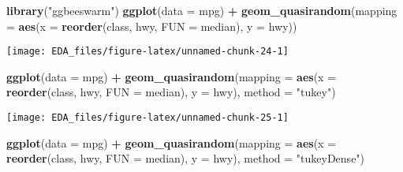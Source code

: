 \documentclass[]{book}
\newenvironment{Shaded}{\begin{snugshade}}{\end{snugshade}}
\newcommand{\DataTypeTok}[1]{\textcolor[rgb]{0.13,0.29,0.53}{#1}}
\newcommand{\KeywordTok}[1]{\textcolor[rgb]{0.13,0.29,0.53}{\textbf{#1}}}
\newcommand{\NormalTok}[1]{#1}
\newcommand{\OperatorTok}[1]{\textcolor[rgb]{0.81,0.36,0.00}{\textbf{#1}}}
\newcommand{\StringTok}[1]{\textcolor[rgb]{0.31,0.60,0.02}{#1}}
\theoremstyle{definition}
\theoremstyle{definition}
\theoremstyle{definition}
\theoremstyle{remark}
\begin{document}
\begin{Shaded}
\begin{Highlighting}[]
\KeywordTok{library}\NormalTok{(}\StringTok{"ggbeeswarm"}\NormalTok{)}
\KeywordTok{ggplot}\NormalTok{(}\DataTypeTok{data =}\NormalTok{ mpg) }\OperatorTok{+}
\StringTok{  }\KeywordTok{geom_quasirandom}\NormalTok{(}\DataTypeTok{mapping =} \KeywordTok{aes}\NormalTok{(}\DataTypeTok{x =} \KeywordTok{reorder}\NormalTok{(class, hwy, }\DataTypeTok{FUN =}\NormalTok{ median),}
                                 \DataTypeTok{y =}\NormalTok{ hwy))}
\end{Highlighting}
\end{Shaded}

\begin{center}\texttt{[image: EDA\_files/figure-latex/unnamed-chunk-24-1]} \end{center}

\begin{Shaded}
\begin{Highlighting}[]
\KeywordTok{ggplot}\NormalTok{(}\DataTypeTok{data =}\NormalTok{ mpg) }\OperatorTok{+}
\StringTok{  }\KeywordTok{geom_quasirandom}\NormalTok{(}\DataTypeTok{mapping =} \KeywordTok{aes}\NormalTok{(}\DataTypeTok{x =} \KeywordTok{reorder}\NormalTok{(class, hwy, }\DataTypeTok{FUN =}\NormalTok{ median),}
                                 \DataTypeTok{y =}\NormalTok{ hwy),}
                   \DataTypeTok{method =} \StringTok{"tukey"}\NormalTok{)}
\end{Highlighting}
\end{Shaded}

\begin{center}\texttt{[image: EDA\_files/figure-latex/unnamed-chunk-25-1]} \end{center}

\begin{Shaded}
\begin{Highlighting}[]
\KeywordTok{ggplot}\NormalTok{(}\DataTypeTok{data =}\NormalTok{ mpg) }\OperatorTok{+}
\StringTok{  }\KeywordTok{geom_quasirandom}\NormalTok{(}\DataTypeTok{mapping =} \KeywordTok{aes}\NormalTok{(}\DataTypeTok{x =} \KeywordTok{reorder}\NormalTok{(class, hwy, }\DataTypeTok{FUN =}\NormalTok{ median),}
                                 \DataTypeTok{y =}\NormalTok{ hwy),}
                   \DataTypeTok{method =} \StringTok{"tukeyDense"}\NormalTok{)}
\end{Highlighting}
\end{Shaded}
\end{document}
